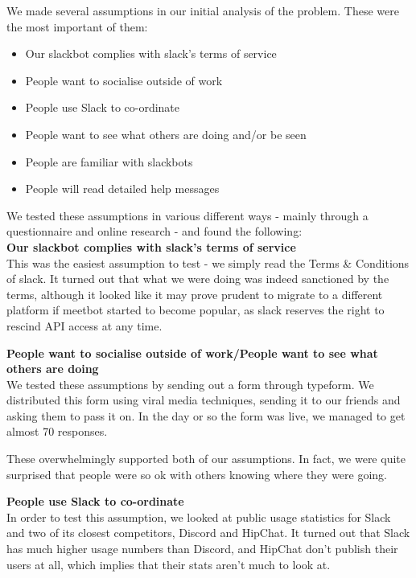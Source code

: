 \documentclass{report}
\begin{document}
We made several assumptions in our initial analysis of the problem. These were the most important of them:

\begin{itemize}
	\item Our slackbot complies with slack's terms of service
	\item People want to socialise outside of work
	\item People use Slack to co-ordinate
	\item People want to see what others are doing and/or be seen
	\item People are familiar with slackbots
	\item People will read detailed help messages
\end{itemize}

We tested these assumptions in various different ways - mainly through a questionnaire and online research - and found the following:\\

\textbf{Our slackbot complies with slack's terms of service}\\
This was the easiest assumption to test - we simply read the Terms \& Conditions of slack. It turned out that what we were doing was indeed sanctioned by the terms, although it looked like it may prove prudent to migrate to a different platform if meetbot started to become popular, as slack reserves the right to rescind API access at any time.

\textbf{People want to socialise outside of work/People want to see what others are doing}\\
We tested these assumptions by sending out a form through typeform. We distributed this form using viral media techniques, sending it to our friends and asking them to pass it on. In the day or so the form was live, we managed to get almost 70 responses.

These overwhelmingly supported both of our assumptions. In fact, we were quite surprised that people were so ok with others knowing where they were going.

\textbf{People use Slack to co-ordinate}\\
In order to test this assumption, we looked at public usage statistics for Slack and two of its closest competitors, Discord and HipChat. It turned out that Slack has much higher usage numbers than Discord, and HipChat don't publish their users at all, which implies that their stats aren't much to look at.
\end{document}
